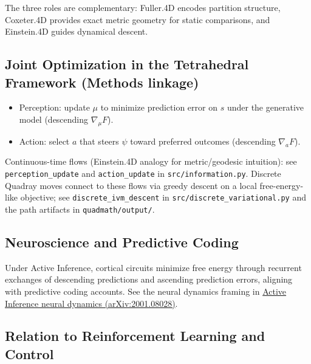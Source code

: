 \documentclass[
]{article}
\providecommand{\tightlist}{%
  \setlength{\itemsep}{0pt}\setlength{\parskip}{0pt}}
\begin{document}
The three roles are complementary: Fuller.4D encodes partition
structure, Coxeter.4D provides exact metric geometry for static
comparisons, and Einstein.4D guides dynamical descent.

\hypertarget{joint-optimization-in-the-tetrahedral-framework-methods-linkage}{%
\subsection{Joint Optimization in the Tetrahedral Framework (Methods
linkage)}\label{joint-optimization-in-the-tetrahedral-framework-methods-linkage}}

\begin{itemize}
\tightlist
\item
  Perception: update \(\mu\) to minimize prediction error on \(s\) under
  the generative model (descending \(\nabla_{\mu} F\)).
\item
  Action: select \(a\) that steers \(\psi\) toward preferred outcomes
  (descending \(\nabla_{a} F\)).
\end{itemize}

Continuous-time flows (Einstein.4D analogy for metric/geodesic
intuition): see \texttt{perception\_update} and \texttt{action\_update}
in \texttt{src/information.py}. Discrete Quadray moves connect to these
flows via greedy descent on a local free-energy-like objective; see
\texttt{discrete\_ivm\_descent} in \texttt{src/discrete\_variational.py}
and the path artifacts in \texttt{quadmath/output/}.

\hypertarget{neuroscience-and-predictive-coding}{%
\subsection{Neuroscience and Predictive
Coding}\label{neuroscience-and-predictive-coding}}

Under Active Inference, cortical circuits minimize free energy through
recurrent exchanges of descending predictions and ascending prediction
errors, aligning with predictive coding accounts. See the neural
dynamics framing in \href{https://arxiv.org/abs/2001.08028}{Active
Inference neural dynamics (arXiv:2001.08028)}.

\hypertarget{relation-to-reinforcement-learning-and-control}{%
\subsection{Relation to Reinforcement Learning and
Control}\label{relation-to-reinforcement-learning-and-control}}
\end{document}
